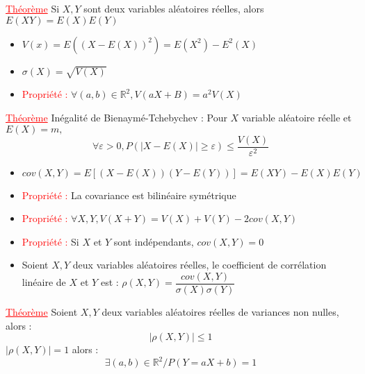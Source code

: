 \documentclass[a4paper, french]{article}
\newcommand{\R}{\mathbb{R}}
\newcommand{\si}{\sigma}
\newcommand{\ep}{\varepsilon}
\newcommand{\thm}{\textcolor{red}{\underline{Théorème} }}
\newcommand{\ppt}{\textcolor{red}{Propriété : }}
\begin{document}
	 \thm Si $X,Y$ sont deux variables aléatoires réelles, alors $E(XY)=E(X)E(Y)$
	 
	  \begin{itemize}[label=\(\bullet\)]
		\item $V(x)=E((X-E(X))^2)=E(X^2)-E^2(X)$
		\item $\si(X)=\sqrt{V(X)}$
		\item \ppt $\forall (a,b) \in \R^2, V(aX+B)=a^2V(X)$
	 \end{itemize}
	
	 \thm Inégalité de Bienaymé-Tchebychev : Pour $X$ variable aléatoire réelle et ${E(X)=m,}$
	 	\[\forall \ep>0, P(|X-E(X)|\geqslant\ep)\leqslant \frac{V(X)}{\ep^2}\]
	 
	  \begin{itemize}[label=\(\bullet\)]
		\item $cov(X,Y)=E[(X-E(X))(Y-E(Y))]=E(XY)-E(X)E(Y)$
		\item \ppt La covariance est bilinéaire symétrique
		\item \ppt $\forall X,Y, V(X+Y)=V(X)+V(Y)-2cov(X,Y)$
		\item \ppt Si $X$ et $Y$ sont indépendants, $cov(X,Y)=0$
		\item Soient $X,Y$ deux variables aléatoires réelles, le coefficient de corrélation linéaire de $X$ et $Y$ est : $\rho(X,Y)=\dfrac{cov(X,Y)}{\si(X)\si(Y)}$
	 \end{itemize}
	
	 \thm  Soient $X,Y$ deux variables aléatoires réelles de variances non nulles, alors :
	  \[{|\rho(X,Y)|\leqslant1}\]  \(|\rho(X,Y)|=1\) alors :
	  \[\exists  (a,b) \in \R^2 / P(Y=aX+b)=1\]
 
\end{document}
